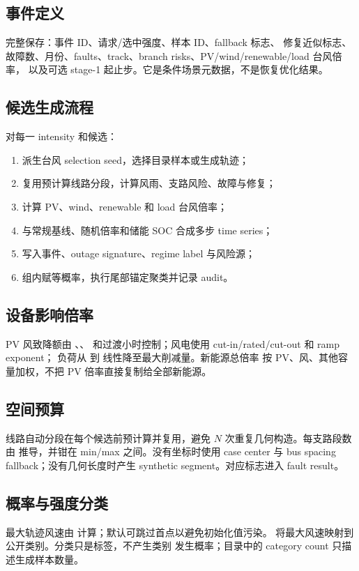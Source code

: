 \subsection{事件定义}
 完整保存：事件 ID、请求/选中强度、样本 ID、fallback 标志、
修复近似标志、故障数、月份、faults、track、branch risks、PV/wind/renewable/load 台风倍率，
以及可选 stage-1 起止步。它是条件场景元数据，不是恢复优化结果。

\subsection{候选生成流程}
对每一 intensity 和候选：
\begin{enumerate}
  \item 派生台风 selection seed，选择目录样本或生成轨迹；
  \item 复用预计算线路分段，计算风雨、支路风险、故障与修复；
  \item 计算 PV、wind、renewable 和 load 台风倍率；
  \item 与常规基线、随机倍率和储能 SOC 合成多步 time series；
  \item 写入事件、outage signature、regime label 与风险源；
  \item 组内赋等概率，执行尾部锚定聚类并记录 audit。
\end{enumerate}

\subsection{设备影响倍率}
PV 风致降额由 、、
 和过渡小时控制；风电使用 cut-in/rated/cut-out 和 ramp exponent；
负荷从  到  线性降至最大削减量。新能源总倍率
按 PV、风、其他容量加权，不把 PV 倍率直接复制给全部新能源。

\subsection{空间预算}
线路自动分段在每个候选前预计算并复用，避免 $N$ 次重复几何构造。每支路段数由
 推导，并钳在 min/max 之间。没有坐标时使用 case center 与
bus spacing fallback；没有几何长度时产生 synthetic segment。对应标志进入 fault result。

\subsection{概率与强度分类}
最大轨迹风速由  计算；默认可跳过首点以避免初始化值污染。
 将最大风速映射到公开类别。分类只是标签，不产生类别
发生概率；目录中的 category count 只描述生成样本数量。

